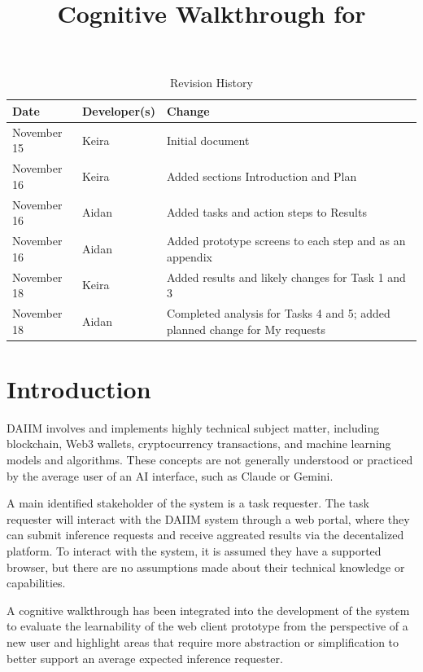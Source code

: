 \documentclass{article}
\title{Cognitive Walkthrough for \progname}
\author{\authname}
\date{}
\begin{document}
\maketitle

\begin{table}[hp]
\caption{Revision History}
\label{TblRevisionHistory}
\begin{tabularx}{\textwidth}{llX}
\toprule
\textbf{Date} & \textbf{Developer(s)} & \textbf{Change}\\
\midrule
November 15 & Keira & Initial document\\
November 16 & Keira & Added sections Introduction and Plan \\
November 16 & Aidan & Added tasks and action steps to Results \\
November 16 & Aidan & Added prototype screens to each step and as an appendix \\
November 18 & Keira & Added results and likely changes for Task 1 and 3 \\
November 18 & Aidan & Completed analysis for Tasks 4 and 5; added planned change for My requests \\
\bottomrule
\end{tabularx}
\end{table}


\newpage

\tableofcontents

\newpage

\section{Introduction}
DAIIM involves and implements highly technical subject matter, including blockchain, Web3 wallets, 
cryptocurrency transactions, and machine learning models and algorithms. These concepts are not generally 
understood or practiced by the average user of an AI interface, such as Claude or Gemini.

A main identified stakeholder of the system is a task requester. The task requester will interact 
with the DAIIM system through a web portal, where they can submit inference requests and receive 
aggreated results via the decentalized platform. To interact with the system, it is assumed they have
a supported browser, but there are no assumptions made about their technical knowledge or capabilities. 

A cognitive walkthrough has been integrated into the development of the system to evaluate the 
learnability of the web client prototype from the perspective of a new user and highlight areas that require more abstraction or 
simplification to better support an average expected inference requester.
\end{document}
